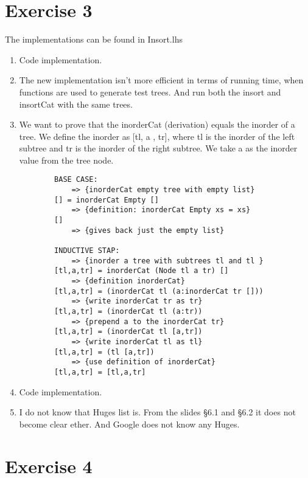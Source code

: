 \documentclass{article}
\begin{document}
\section*{Exercise 3}
The implementations can be found in Insort.lhs\\
\begin{enumerate}
    \item Code implementation.
    \item The new implementation isn't more efficient in terms of running time, when functions are used to generate test trees. And run both the insort and insortCat with the same trees.
    \item We want to prove that the inorderCat (derivation) equals the inorder of a tree. We define the inorder as [tl, a , tr], where tl is the inorder of the left subtree and tr is the inorder of the right subtree. We take a as the inorder value from the tree node.
        \begin{verbatim}
        BASE CASE:
            => {inorderCat empty tree with empty list}
        [] = inorderCat Empty []
            => {definition: inorderCat Empty xs = xs}
        []
            => {gives back just the empty list}

        INDUCTIVE STAP:
            => {inorder a tree with subtrees tl and tl }
        [tl,a,tr] = inorderCat (Node tl a tr) []
            => {definition inorderCat}
        [tl,a,tr] = (inorderCat tl (a:inorderCat tr []))
            => {write inorderCat tr as tr}
        [tl,a,tr] = (inorderCat tl (a:tr))
            => {prepend a to the inorderCat tr}
        [tl,a,tr] = (inorderCat tl [a,tr])
            => {write inorderCat tl as tl}
        [tl,a,tr] = (tl [a,tr])
            => {use definition of inorderCat}
        [tl,a,tr] = [tl,a,tr]
        \end{verbatim}

    \item Code implementation.
    \item I do not know that Huges list is. From the slides §6.1 and §6.2 it does not become clear ether. And Google does not know any Huges.
\end{enumerate}


\section*{Exercise 4}
%
%
%
%
\end{document}
